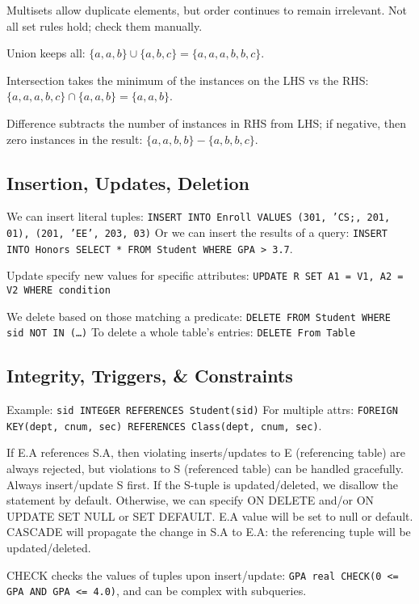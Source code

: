 \documentclass[10pt,letterpaper,twocolumn]{article}
\begin{document}
Multisets allow duplicate elements, but order 
continues to remain irrelevant. 
Not all set rules hold; check them manually.

Union keeps all: $ \{a, a, b\} \cup \{a, b, c\} 
= \{ a, a, a, b, b, c \} $. 

Intersection takes the minimum of the instances
on the LHS vs the RHS: $ \{a, a, a, b, c \} \cap 
\{a, a, b \} = \{a, a, b\} $.

Difference subtracts the number of instances in 
RHS from LHS; if negative, then zero instances
in the result: $ \{a, a, b, b\} - \{a, b, b, c\} $.


\subsection{Insertion, Updates, Deletion}

We can insert literal tuples: \texttt{INSERT INTO Enroll VALUES (301, 'CS;, 201, 01), (201, 'EE', 203, 03)}
Or we can insert the results of a query: 
\texttt{INSERT INTO Honors SELECT * FROM Student
WHERE GPA > 3.7}.


Update specify new values for specific attributes: 
\texttt{UPDATE R SET A1 = V1, A2 = V2 WHERE condition}

We delete based on those matching a predicate: 
\texttt{DELETE FROM Student WHERE sid NOT IN (\dots)}
To delete a whole table's entries: \texttt{DELETE From Table}


\subsection{Integrity, Triggers, \& Constraints}

Example: \texttt{sid INTEGER REFERENCES Student(sid)}
For multiple attrs: \texttt{FOREIGN KEY(dept, cnum, sec)
REFERENCES Class(dept, cnum, sec)}.

If E.A references S.A, then violating inserts/updates
to E (referencing table) are always rejected, but 
violations to S (referenced table) can be handled
gracefully. Always insert/update S first. If the S-tuple 
is updated/deleted, we disallow the statement by default. 
Otherwise, we can specify ON DELETE and/or ON UPDATE
SET NULL or SET DEFAULT. E.A value will be set to null 
or default. CASCADE will propagate the change in S.A 
to E.A: the referencing tuple will be updated/deleted. 

CHECK checks the values of tuples upon insert/update: 
\texttt{GPA real CHECK(0 <= GPA AND GPA <= 4.0)}, 
and can be complex with subqueries.
\end{document}
